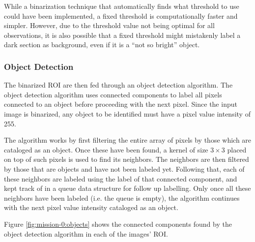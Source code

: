 While a binarization technique that automatically finds what threshold to use could have been implemented, a fixed threshold is computationally faster and simpler. However, due to the threshold value not being optimal for all observations, it is also possible that a fixed threshold might mistakenly label a dark section as background, even if it is a ``not so bright'' object.

\subsubsection{Object Detection} \label{subsubsect:case-study:impl:objects}
The binarized ROI are then fed through an object detection algorithm. The object detection algorithm uses connected components to label all pixels connected to an object before proceeding with the next pixel. Since the input image is binarized, any object to be identified must have a pixel value intensity of 255. \newline

The algorithm works by first filtering the entire array of pixels by those which are cataloged as an object. Once these have been found, a kernel of size $3 \times 3$ placed on top of such pixels is used to find its neighbors. The neighbors are then filtered by those that are objects and have not been labeled yet. Following that, each of these neighbors are labeled using the label of that connected component, and kept track of in a queue data structure for follow up labelling. Only once all these neighbors have been labeled (i.e. the queue is empty), the algorithm continues with the next pixel value intensity cataloged as an object. \newline

Figure \ref{fig:mission-0:objects} shows the connected components found by the object detection algorithm in each of the images' ROI.

